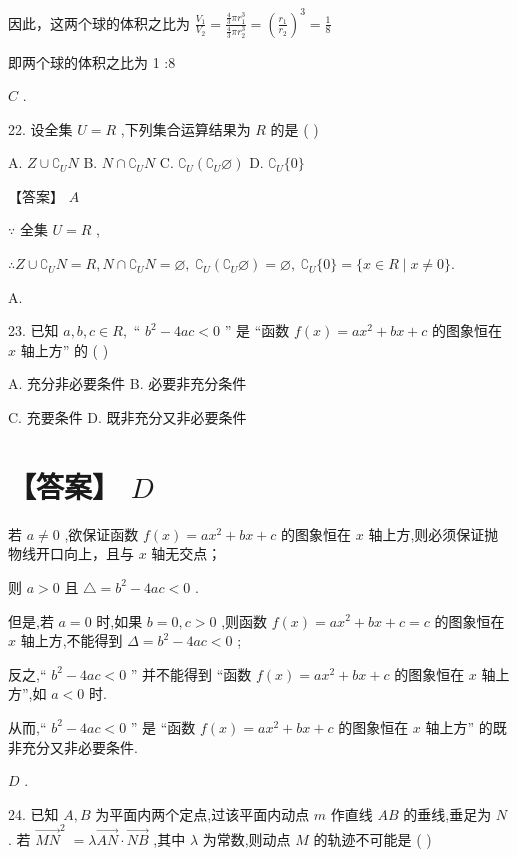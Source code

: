 \documentclass[10pt]{article}
\begin{document}
因此，这两个球的体积之比为 \(\frac{{V}_{1}}{{V}_{2}} = \frac{\frac{4}{3}\pi {r}_{1}^{3}}{\frac{4}{3}\pi {r}_{2}^{3}} = {\left( \frac{{r}_{1}}{{r}_{2}}\right) }^{3} = \frac{1}{8}\)

即两个球的体积之比为 1 :8

\(C\) .

22. 设全集 \(U = R\) ,下列集合运算结果为 \(R\) 的是 ( )

A. \(Z \cup  {\complement }_{U}N\) B. \(N \cap  {\complement }_{U}N\) C. \({\complement }_{U}\left( {{\complement }_{U}\varnothing }\right)\) D. \({\complement }_{U}\{ 0\}\)

【答案】 \(A\)

\(\because\) 全集 \(U = R\) ,

\(\therefore Z \cup  {\complement }_{U}N = R,N \cap  {\complement }_{U}N = \varnothing ,\;{\complement }_{U}\left( {{\complement }_{U}\varnothing }\right)  = \varnothing ,\;{\complement }_{U}\{ 0\}  = \{ x \in  R \mid  x \neq  0\} .\)

A.

23. 已知 \(a,b,c \in  R,\) “ \({b}^{2} - {4ac} < 0\) ” 是 “函数 \(f\left( x\right)  = a{x}^{2} + {bx} + c\) 的图象恒在 \(x\) 轴上方” 的 ( )

A. 充分非必要条件 B. 必要非充分条件

C. 充要条件 D. 既非充分又非必要条件

\section*{【答案】 \(D\)}

若 \(a \neq  0\) ,欲保证函数 \(f\left( x\right)  = a{x}^{2} + {bx} + c\) 的图象恒在 \(x\) 轴上方,则必须保证抛物线开口向上，且与 \(x\) 轴无交点；

则 \(a > 0\) 且 \(\bigtriangleup  = {b}^{2} - {4ac} < 0\) .

但是,若 \(a = 0\) 时,如果 \(b = 0,c > 0\) ,则函数 \(f\left( x\right)  = a{x}^{2} + {bx} + c = c\) 的图象恒在 \(x\) 轴上方,不能得到 \(\Delta  = {b}^{2} - {4ac} < 0\) ;

反之,“ \({b}^{2} - {4ac} < 0\) ” 并不能得到 “函数 \(f\left( x\right)  = a{x}^{2} + {bx} + c\) 的图象恒在 \(x\) 轴上方”,如 \(a < 0\) 时.

从而,“ \({b}^{2} - {4ac} < 0\) ” 是 “函数 \(f\left( x\right)  = a{x}^{2} + {bx} + c\) 的图象恒在 \(x\) 轴上方” 的既非充分又非必要条件.

\(D\) .

24. 已知 \(A,B\) 为平面内两个定点,过该平面内动点 \(m\) 作直线 \({AB}\) 的垂线,垂足为 \(N\) . 若 \({\overrightarrow{MN}}^{2} \; = \lambda \overrightarrow{AN} \cdot  \overrightarrow{NB}\) ,其中 \(\lambda\) 为常数,则动点 \(M\) 的轨迹不可能是 ( )
\end{document}
